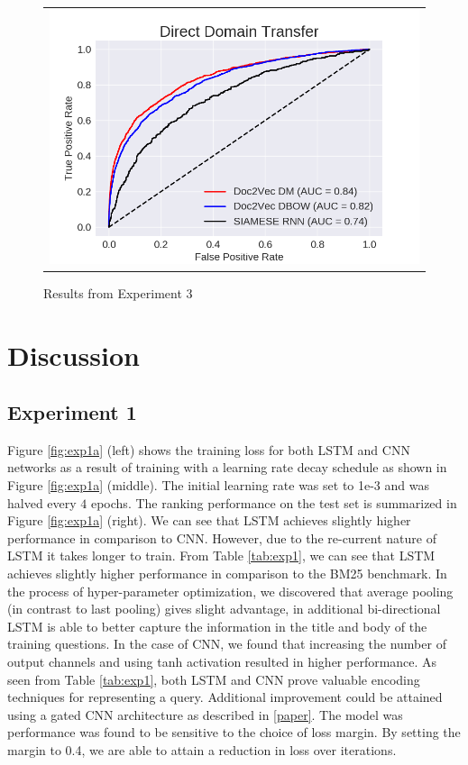 \documentclass{sigkddExp}
\begin{document}
\begin{figure}[h]
\begin{tabular}{c}
    \includegraphics[width=\columnwidth]{img/report_da_roc_part3.png}
\end{tabular}
\label{fig:exp3}
\caption{Results from Experiment 3}
\end{figure}

\section{Discussion}
\label{discussion}
\subsection{Experiment 1}
{\color{red} Figure \ref{fig:exp1a} (left) shows the training loss for both LSTM and CNN networks as a result of training with a learning rate decay schedule as shown in Figure \ref{fig:exp1a} (middle). The initial learning rate was set to 1e-3 and was halved every $4$ epochs. The ranking performance on the test set is summarized in Figure \ref{fig:exp1a} (right). We can see that LSTM achieves slightly higher performance in comparison to CNN. However, due to the re-current nature of LSTM it takes longer to train. From Table \ref{tab:exp1}, we can see that LSTM achieves slightly higher performance in comparison to the BM25 benchmark. In the process of hyper-parameter optimization, we discovered that average pooling (in contrast to last pooling) gives slight advantage, in additional bi-directional LSTM is able to better capture the information in the title and body of the training questions. In the case of CNN, we found that increasing the number of output channels and using tanh activation resulted in higher performance. As seen from Table \ref{tab:exp1}, both LSTM and CNN prove valuable encoding techniques for representing a query. Additional improvement could be attained using a gated CNN architecture as described in \ref{paper}. The model was performance was found to be sensitive to the choice of loss margin. By setting the margin to 0.4, we are able to attain a reduction in loss over iterations.}
\end{document}
